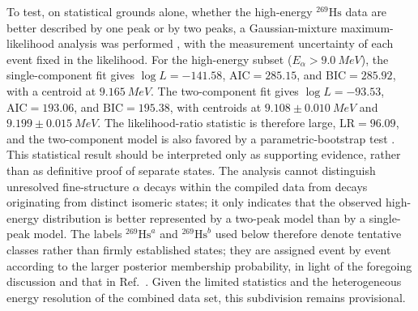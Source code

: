 \documentclass[aps,prc,reprint,superscriptaddress,floatfix]{revtex4-2}
\begin{document}
To test, on statistical grounds alone, whether the high-energy $^{269}\mathrm{Hs}$ data are better described by one peak or by two peaks, a Gaussian-mixture maximum-likelihood analysis was performed \cite{mclachlan2004MixtureModellingCluster}, with the measurement uncertainty of each event fixed in the likelihood. For the high-energy subset ($E_{\alpha}>9.0~\si{MeV}$), the single-component fit gives $\log L=-141.58$, $\mathrm{AIC}=285.15$, and $\mathrm{BIC}=285.92$, with a centroid at $9.165~\si{MeV}$. The two-component fit gives $\log L=-93.53$, $\mathrm{AIC}=193.06$, and $\mathrm{BIC}=195.38$, with centroids at $9.108 \pm 0.010~\si{MeV}$ and $9.199 \pm 0.015~\si{MeV}$. The likelihood-ratio statistic is therefore large, $\mathrm{LR}=96.09$, and the two-component model is also favored by a parametric-bootstrap test \cite{mclachlan1987BootstrappingLikelihoodRatio}. This statistical result should be interpreted only as supporting evidence, rather than as definitive proof of separate states. The analysis cannot distinguish unresolved fine-structure $\alpha$ decays within the compiled data from decays originating from distinct isomeric states; it only indicates that the observed high-energy distribution is better represented by a two-peak model than by a single-peak model. The labels $^{269}\mathrm{Hs}^{a}$ and $^{269}\mathrm{Hs}^{b}$ used below therefore denote tentative classes rather than firmly established states; they are assigned event by event according to the larger posterior membership probability, in light of the foregoing discussion and that in Ref.~\cite{oganessian2024SynthesisDecayProperties}. Given the limited statistics and the heterogeneous energy resolution of the combined data set, this subdivision remains provisional.
\end{document}
